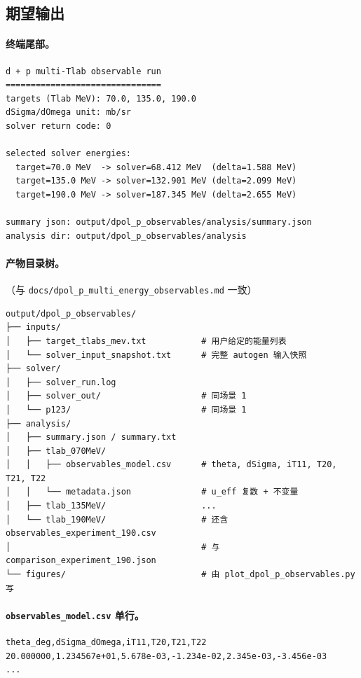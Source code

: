 \subsection{期望输出}
\label{sec:ch20-s2-expect}

\paragraph{终端尾部。}
\begin{lstlisting}[style=config]
d + p multi-Tlab observable run
===============================
targets (Tlab MeV): 70.0, 135.0, 190.0
dSigma/dOmega unit: mb/sr
solver return code: 0

selected solver energies:
  target=70.0 MeV  -> solver=68.412 MeV  (delta=1.588 MeV)
  target=135.0 MeV -> solver=132.901 MeV (delta=2.099 MeV)
  target=190.0 MeV -> solver=187.345 MeV (delta=2.655 MeV)

summary json: output/dpol_p_observables/analysis/summary.json
analysis dir: output/dpol_p_observables/analysis
\end{lstlisting}

\paragraph{产物目录树。}
（与 \texttt{docs/dpol\_p\_multi\_energy\_observables.md} 一致）
\begin{lstlisting}[style=config]
output/dpol_p_observables/
├── inputs/
│   ├── target_tlabs_mev.txt           # 用户给定的能量列表
│   └── solver_input_snapshot.txt      # 完整 autogen 输入快照
├── solver/
│   ├── solver_run.log
│   ├── solver_out/                    # 同场景 1
│   └── p123/                          # 同场景 1
├── analysis/
│   ├── summary.json / summary.txt
│   ├── tlab_070MeV/
│   │   ├── observables_model.csv      # theta, dSigma, iT11, T20, T21, T22
│   │   └── metadata.json              # u_eff 复数 + 不变量
│   ├── tlab_135MeV/                   ...
│   └── tlab_190MeV/                   # 还含 observables_experiment_190.csv
│                                      # 与 comparison_experiment_190.json
└── figures/                           # 由 plot_dpol_p_observables.py 写
\end{lstlisting}

\paragraph{\texttt{observables\_model.csv} 单行。}
\begin{lstlisting}[style=config]
theta_deg,dSigma_dOmega,iT11,T20,T21,T22
20.000000,1.234567e+01,5.678e-03,-1.234e-02,2.345e-03,-3.456e-03
...
\end{lstlisting}

